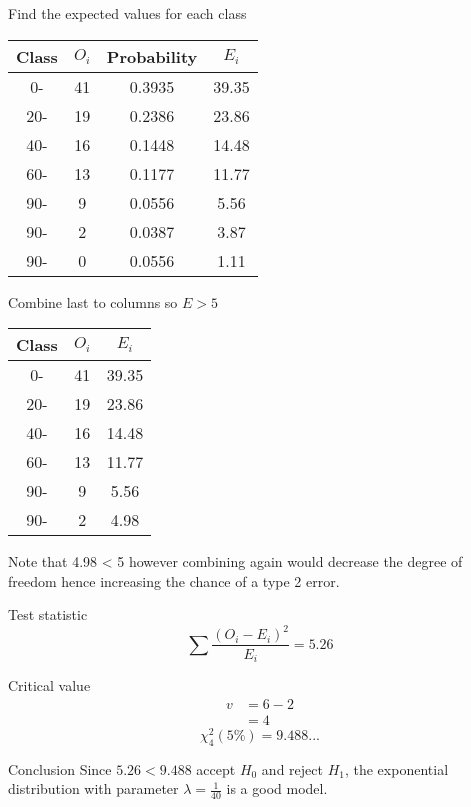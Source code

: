 \begin{example}
        \begin{step}{Find the expected values for each class}
        \begin{center}
        \begin{tabular}{c|c|c|c}
        Class & $O_i$ & Probability & $E_i$ \\
        \hline
        0- & 41 & 0.3935 & 39.35 \\
        20- & 19 & 0.2386 & 23.86 \\
        40- & 16 & 0.1448 & 14.48 \\
        60- & 13 & 0.1177 & 11.77 \\
        90- & 9 & 0.0556 & 5.56 \\
        90- & 2 & 0.0387 & 3.87 \\
        90- & 0 & 0.0556 & 1.11 \\
        \end{tabular}
        \end{center}

        Combine last to columns so $E > 5$
        \begin{center}
        \begin{tabular}{c|c|c}
        Class & $O_i$ & $E_i$ \\
        \hline
        0- & 41  & 39.35 \\
        20- & 19 & 23.86 \\
        40- & 16 & 14.48 \\
        60- & 13 & 11.77 \\
        90- & 9  & 5.56 \\
        90- & 2  & 4.98 \\
        \end{tabular}
        \end{center}
        Note that 4.98 < 5 however combining again would decrease the degree of freedom hence increasing the chance of a type 2 error.
        \end{step}

        \begin{step}{Test statistic}
        $$
        \sum{\frac{(O_i - E_i)^2}{E_i}} = 5.26
        $$
        \end{step}

        \begin{step}{Critical value}
        \begin{align*}
        v &= 6 - 2 \\
        &= 4
        \end{align*}
        $$
        \chi^2_4(5\%) = 9.488...
        $$
        \end{step}

        \begin{step}{Conclusion}
        Since $5.26 < 9.488$ accept $H_0$ and reject $H_1$, the exponential distribution with parameter $\lambda = \displaystyle\frac{1}{40}$ is a good model.
        \end{step}

        \end{example}


